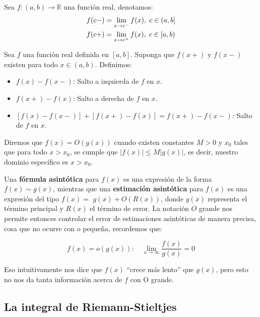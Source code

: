 Sea $f:(a,b) \longrightarrow \mathbb{R}$ una función real, denotamos:
   \begin{align*}
       f(c-)&=\lim_{x \rightarrow c^-} f(x), \hspace{0.1cm} c \in (a,b] \notag \\
       f(c+)&=\lim_{x \rightarrow c^+} f(x), \hspace{0.1cm} c \in [a,b) 
   \end{align*}

\begin{definition}
    Sea $f$ una función real definida en $[a,b]$. Suponga que $f(x+)$ y $f(x-)$ existen para todo $x \in (a,b)$. Definimos: 
       \begin{itemize}
           \item $f(x)-f(x-)$: Salto a izquierda de $f$ en $x$.
           \item $f(x+)-f(x)$: Salto a derecha de $f$ en $x$.
           \item $[f(x)-f(x-)]+[f(x+)-f(x)]=f(x+)-f(x-)$: Salto de $f$ en $x$.
       \end{itemize}
\end{definition}

\begin{note}
Diremos que $f(x)=O(g(x))$ cuando existen constantes $M>0$ y $x_0$ tales que para todo $x>x_0$, se cumple que $|f(x)| \leq M|g(x)|$, es decir, nuestro dominio específico es $x>x_0$.\\
\end{note}

Una \textbf{fórmula asintótica} para $f(x)$ es una expresión de la forma $f(x) \sim g(x)$, mientras que una \textbf{estimación asintótica} para $f(x)$ es una expresión del tipo $f(x)=$ $g(x)+O(R(x))$, donde $g(x)$ representa el término principal y $R(x)$ el término de error. La notación $O$ grande nos permite entonces controlar el error de estimaciones asintóticas de manera precisa, cosa que no ocurre con $o$ pequeña, recordemos que:

$$f(x)=o(g(x)): \quad \displaystyle \lim_{x \to \infty} \frac{f(x)}{g(x)}=0$$

Eso intuitivamente nos dice que $f(x)$ ``crece más lento'' que $g(x)$, pero esto no nos da tanta información acerca de $f$ con O grande. 

\subsection{La integral de Riemann-Stieltjes}

